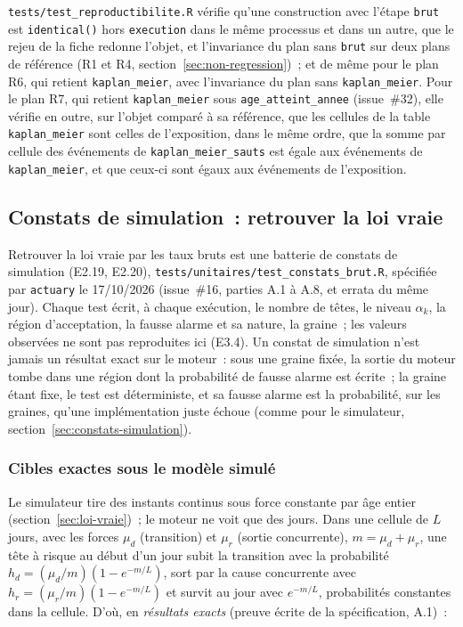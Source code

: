 \documentclass[a4paper,11pt]{article}
\newcommand{\code}[1]{\texttt{\small #1}}
\begin{document}
\medskip
\code{tests/test\_reproductibilite.R} vérifie qu'une construction avec
l'étape \code{brut} est \code{identical()} hors \code{execution} dans le même
processus et dans un autre, que le rejeu de la fiche redonne l'objet, et
l'invariance du plan sans \code{brut} sur deux plans de référence (R1 et
R4, section~\ref{sec:non-regression})~; et de même pour le plan R6, qui retient \code{kaplan\_meier}, avec
l'invariance du plan sans \code{kaplan\_meier}. Pour le plan R7, qui retient
\code{kaplan\_meier} sous \code{age\_atteint\_annee} (issue~\#32), elle
vérifie en outre, sur l'objet comparé à sa référence, que les cellules de
la table \code{kaplan\_meier} sont celles de l'exposition, dans le même
ordre, que la somme par cellule des événements de
\code{kaplan\_meier\_sauts} est égale aux événements de
\code{kaplan\_meier}, et que ceux-ci sont égaux aux événements de
l'exposition.

\subsection{Constats de simulation~: retrouver la loi vraie}
\label{sec:constats-brut}

Retrouver la loi vraie par les taux bruts est une batterie de constats de
simulation (E2.19, E2.20), \code{tests/unitaires/test\_constats\_brut.R},
spécifiée par \code{actuary} le 17/10/2026 (issue~\#16, parties A.1 à A.8,
et errata du même jour). Chaque test écrit, à chaque exécution, le nombre de
têtes, le niveau $\alpha_k$, la région d'acceptation, la fausse alarme et sa
nature, la graine~; les valeurs observées ne sont pas reproduites ici (E3.4).
Un constat de simulation n'est jamais un résultat exact sur le moteur~: sous
une graine fixée, la sortie du moteur tombe dans une région dont la
probabilité de fausse alarme est écrite~; la graine étant fixe, le test est
déterministe, et sa fausse alarme est la probabilité, sur les graines, qu'une
implémentation juste échoue (comme pour le simulateur,
section~\ref{sec:constats-simulation}).

\subsubsection*{Cibles exactes sous le modèle simulé}

Le simulateur tire des instants continus sous force constante par âge entier
(section~\ref{sec:loi-vraie})~; le moteur ne voit que des jours. Dans une
cellule de $L$ jours, avec les forces $\mu_d$ (transition) et $\mu_r$ (sortie
concurrente), $m = \mu_d + \mu_r$, une tête à risque au début d'un jour subit
la transition avec la probabilité $h_d = (\mu_d/m)(1 - e^{-m/L})$, sort par
la cause concurrente avec $h_r = (\mu_r/m)(1 - e^{-m/L})$ et survit au jour
avec $e^{-m/L}$, probabilités constantes dans la cellule. D'où, en
\emph{résultats exacts} (preuve écrite de la spécification, A.1)~:
\end{document}
